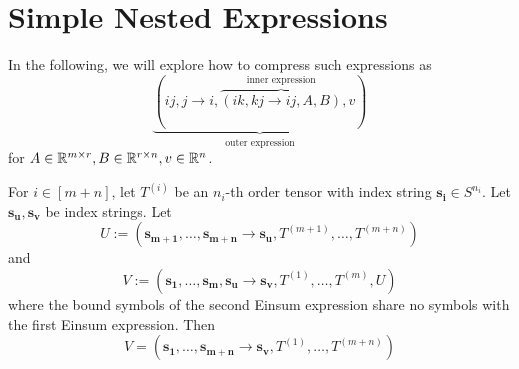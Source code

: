 \section{Simple Nested Expressions}

In the following, we will explore how to compress such expressions as
$$\underbrace{(ij, j \rightarrow i, \overbrace{(ik, kj \rightarrow ij, A, B)}^{\text{inner expression}}, v)}_{\text{outer expression}}$$
for $A \in \mathbb{R}^{m \times r}, B \in \mathbb{R}^{r \times n}, v \in \mathbb{R}^n$.

\begin{theorem}
    \label{thm:nested_einsum:1}

    For $i \in [m + n]$, let $T^{(i)}$ be an $n_i$-th order tensor with index string $\bm{s_i} \in S^{n_i}$.
    Let $\bm{s_u}, \bm{s_v}$ be index strings.
    Let
    $$U := (\bm{s_{m + 1}},\dots,\bm{s_{m + n}} \rightarrow \bm{s_u}, T^{(m + 1)},\dots,T^{(m + n)})$$
    and
    $$V := (\bm{s_1},\dots,\bm{s_m}, \bm{s_u} \rightarrow \bm{s_v}, T^{(1)},\dots,T^{(m)}, U)$$
    where the bound symbols of the second Einsum expression share no symbols with the first Einsum expression.
    Then
    $$V = (\bm{s_1}, \dots, \bm{s_{m + n}} \rightarrow \bm{s_v}, T^{(1)}, \dots, T^{(m + n)})$$
\end{theorem}

